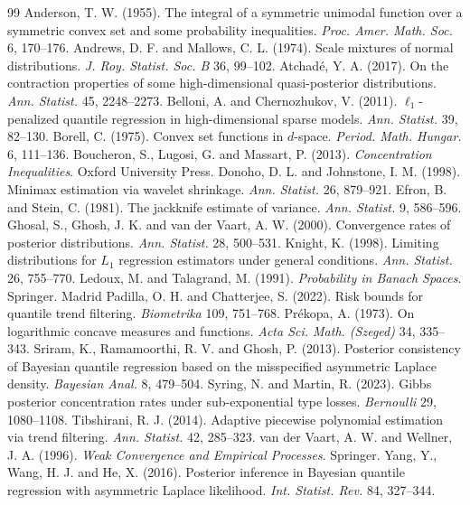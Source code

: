 \documentclass[11pt]{article}
\theoremstyle{definition}
\theoremstyle{remark}
\begin{document}
\begin{thebibliography}{99}\small\setlength{\itemsep}{0pt}
 Anderson, T. W. (1955). The integral of a symmetric unimodal function over a symmetric convex set and some probability inequalities. \emph{Proc. Amer. Math. Soc.} 6, 170--176.
 Andrews, D. F. and Mallows, C. L. (1974). Scale mixtures of normal distributions. \emph{J. Roy. Statist. Soc. B} 36, 99--102.
 Atchad\'e, Y. A. (2017). On the contraction properties of some high-dimensional quasi-posterior distributions. \emph{Ann. Statist.} 45, 2248--2273.
 Belloni, A. and Chernozhukov, V. (2011). $\ell_1$-penalized quantile regression in high-dimensional sparse models. \emph{Ann. Statist.} 39, 82--130.
 Borell, C. (1975). Convex set functions in $d$-space. \emph{Period. Math. Hungar.} 6, 111--136.
 Boucheron, S., Lugosi, G. and Massart, P. (2013). \emph{Concentration Inequalities}. Oxford University Press.
 Donoho, D. L. and Johnstone, I. M. (1998). Minimax estimation via wavelet shrinkage. \emph{Ann. Statist.} 26, 879--921.
 Efron, B. and Stein, C. (1981). The jackknife estimate of variance. \emph{Ann. Statist.} 9, 586--596.
 Ghosal, S., Ghosh, J. K. and van der Vaart, A. W. (2000). Convergence rates of posterior distributions. \emph{Ann. Statist.} 28, 500--531.
 Knight, K. (1998). Limiting distributions for $L_1$ regression estimators under general conditions. \emph{Ann. Statist.} 26, 755--770.
 Ledoux, M. and Talagrand, M. (1991). \emph{Probability in Banach Spaces}. Springer.
 Madrid Padilla, O. H. and Chatterjee, S. (2022). Risk bounds for quantile trend filtering. \emph{Biometrika} 109, 751--768.
 Pr\'ekopa, A. (1973). On logarithmic concave measures and functions. \emph{Acta Sci. Math. (Szeged)} 34, 335--343.
 Sriram, K., Ramamoorthi, R. V. and Ghosh, P. (2013). Posterior consistency of Bayesian quantile regression based on the misspecified asymmetric Laplace density. \emph{Bayesian Anal.} 8, 479--504.
 Syring, N. and Martin, R. (2023). Gibbs posterior concentration rates under sub-exponential type losses. \emph{Bernoulli} 29, 1080--1108.
 Tibshirani, R. J. (2014). Adaptive piecewise polynomial estimation via trend filtering. \emph{Ann. Statist.} 42, 285--323.
 van der Vaart, A. W. and Wellner, J. A. (1996). \emph{Weak Convergence and Empirical Processes}. Springer.
 Yang, Y., Wang, H. J. and He, X. (2016). Posterior inference in Bayesian quantile regression with asymmetric Laplace likelihood. \emph{Int. Statist. Rev.} 84, 327--344.
\end{thebibliography}
\end{document}
